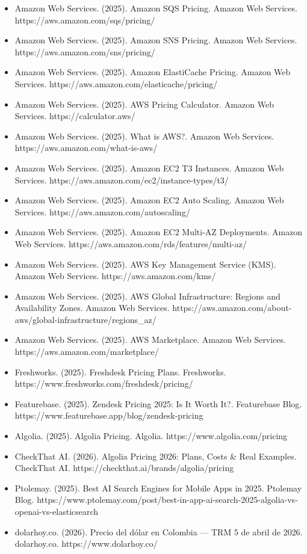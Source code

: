 \documentclass[12pt,a4paper]{article}
\begin{document}
\begin{itemize}
    \item Amazon Web Services. (2025). Amazon SQS Pricing. Amazon Web Services. https://aws.amazon.com/sqs/pricing/
    \item Amazon Web Services. (2025). Amazon SNS Pricing. Amazon Web Services. https://aws.amazon.com/sns/pricing/
    \item Amazon Web Services. (2025). Amazon ElastiCache Pricing. Amazon Web Services. https://aws.amazon.com/elasticache/pricing/
    \item Amazon Web Services. (2025). AWS Pricing Calculator. Amazon Web Services. https://calculator.aws/
    \item Amazon Web Services. (2025). What is AWS?. Amazon Web Services. https://aws.amazon.com/what-is-aws/
    \item Amazon Web Services. (2025). Amazon EC2 T3 Instances. Amazon Web Services. https://aws.amazon.com/ec2/instance-types/t3/
    \item Amazon Web Services. (2025). Amazon EC2 Auto Scaling. Amazon Web Services. https://aws.amazon.com/autoscaling/
    \item Amazon Web Services. (2025). Amazon EC2 Multi-AZ Deployments. Amazon Web Services. https://aws.amazon.com/rds/features/multi-az/
    \item Amazon Web Services. (2025). AWS Key Management Service (KMS). Amazon Web Services. https://aws.amazon.com/kms/
    \item Amazon Web Services. (2025). AWS Global Infrastructure: Regions and Availability Zones. Amazon Web Services. https://aws.amazon.com/about-aws/global-infrastructure/regions\_az/
    \item Amazon Web Services. (2025). AWS Marketplace. Amazon Web Services. https://aws.amazon.com/marketplace/
    \item Freshworks. (2025). Freshdesk Pricing Plans. Freshworks. https://www.freshworks.com/freshdesk/pricing/
    \item Featurebase. (2025). Zendesk Pricing 2025: Is It Worth It?. Featurebase Blog. https://www.featurebase.app/blog/zendesk-pricing
    \item Algolia. (2025). Algolia Pricing. Algolia. https://www.algolia.com/pricing
    \item CheckThat AI. (2026). Algolia Pricing 2026: Plans, Costs \& Real Examples. CheckThat AI. https://checkthat.ai/brands/algolia/pricing
    \item Ptolemay. (2025). Best AI Search Engines for Mobile Apps in 2025. Ptolemay Blog. https://www.ptolemay.com/post/best-in-app-ai-search-2025-algolia-vs-openai-vs-elasticsearch
    \item dolarhoy.co. (2026). Precio del dólar en Colombia — TRM 5 de abril de 2026. dolarhoy.co. https://www.dolarhoy.co/
\end{itemize}
\end{document}
